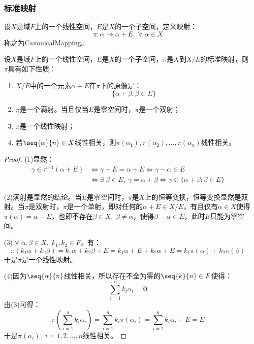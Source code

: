 \subsubsection{标准映射}
\begin{definition}
	设$X$是域$F$上的一个线性空间，$E$是$X$的一个子空间，定义映射：
	\begin{equation*}
		\pi:\alpha\longrightarrow\alpha+E,\;\forall\;\alpha\in X
	\end{equation*}
	称之为\gls{CanonicalMapping}。
\end{definition}
\begin{property}\label{prop:CanonicalMap}
	设$X$是域$F$上的一个线性空间，$E$是$X$的一个子空间，$\pi$是$X$到$X/E$的标准映射，则$\pi$具有如下性质：
	\begin{enumerate}
		\item $X/E$中的一个元素$\alpha+E$在$\pi$下的原像是：
		\begin{equation*}
			\{\alpha+\beta:\beta\in E\}
		\end{equation*}
		\item $\pi$是一个满射。当且仅当$E$是零空间时，$\pi$是一个双射；
		\item $\pi$是一个线性映射；
		\item 若$\seq{\alpha}{n}\in X$线性相关，则$\pi(\alpha_1),\pi(\alpha_2),\dots,\pi(\alpha_n)$线性相关。
	\end{enumerate}
\end{property}
\begin{proof}
	(1)显然：
	\begin{align*}
		\gamma\in\pi^{-1}(\alpha+E)
		&\Leftrightarrow
		\gamma+E=\alpha+E
		\Leftrightarrow
		\gamma-\alpha\in E \\
		&\Leftrightarrow
		\exists\;\beta\in E,\;\gamma=\alpha+\beta
		\Leftrightarrow
		\gamma\in\{\alpha+\beta:\beta\in E\}
	\end{align*}\par
	(2)满射是显然的结论。当$E$是零空间时，$\pi$是$X$上的恒等变换，恒等变换显然是双射。当$\pi$是双射时，$\pi$是一个单射，即对任何的$\alpha+E\in X/E$，有且仅有$\alpha\in X$使得$\pi(\alpha)=\alpha+E$，也即不存在$\beta\in X,\;\beta\ne\alpha$，使得$\beta-\alpha\in E$，此时$E$只能为零空间。\par
	(3)$\;\forall\;\alpha,\beta\in X,\;k_1,k_2\in F$，有：
	\begin{equation*}
		\pi(k_1\alpha+k_2\beta)=k_1\alpha+k_2\beta+E=k_1\alpha+E+k_2\alpha+E=k_1\pi(\alpha)+k_2\pi(\beta)
	\end{equation*}
	于是$\pi$是一个线性映射。\par
	(4)因为$\seq{\alpha}{n}$线性相关，所以存在不全为零的$\seq{k}{n}\in F$使得：
	\begin{equation*}
		\sum_{i=1}^{n}k_i\alpha_i=\mathbf{0}
	\end{equation*}
	由(3)可得：
	\begin{equation*}
		\pi\left(\sum_{i=1}^{n}k_i\alpha_i\right)=\sum_{i=1}^{n}k_i\pi(\alpha_i)=\sum_{i=1}^{n}k_i\alpha_i+E=E
	\end{equation*}
	于是$\pi(\alpha_i),\;i=1,2,\dots,n$线性相关。
\end{proof}
